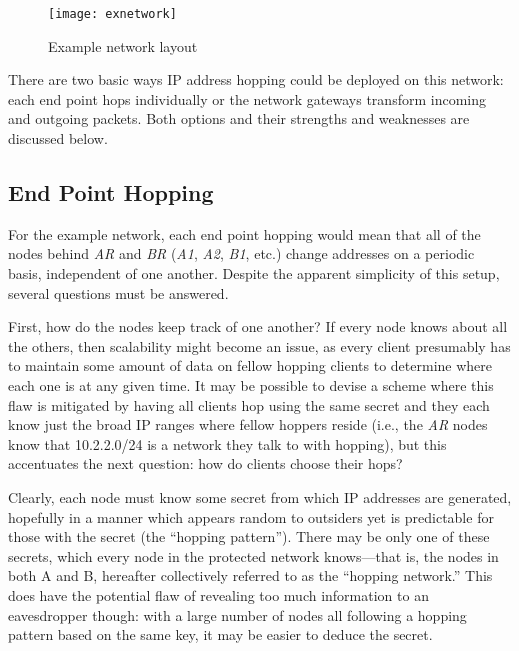 \begin{figure}
	\centering
	\texttt{[image: exnetwork]}
	\caption{Example network layout}
	\label{fig:exnetwork}
\end{figure}

\par There are two basic ways IP address hopping could be deployed on this network: each end point hops individually or the network gateways transform incoming and outgoing packets. Both options and their strengths and weaknesses are discussed below.

\subsection{End Point Hopping}
\par For the example network, each end point hopping would mean that all of the nodes behind \textit{AR} and \textit{BR} (\textit{A1}, \textit{A2}, \textit{B1}, etc.) change addresses on a periodic basis, independent of one another. Despite the apparent simplicity of this setup, several questions must be answered.

\par First, how do the nodes keep track of one another? If every node knows about all the others, then scalability might become an issue, as every client presumably has to maintain some amount of data on fellow hopping clients to determine where each one is at any given time. It may be possible to devise a scheme where this flaw is mitigated by having all clients hop using the same secret and they each know just the broad IP ranges where fellow hoppers reside (i.e., the \textit{AR} nodes know that 10.2.2.0/24 is a network they talk to with hopping), but this accentuates the next question: how do clients choose their hops?

\par Clearly, each node must know some secret from which IP addresses are generated, hopefully in a manner which appears random to outsiders yet is predictable for those with the secret (the ``hopping pattern''). There may be only one of these secrets, which every node in the protected network knows---that is, the nodes in both A and B, hereafter collectively referred to as the ``hopping network.'' This does have the potential flaw of revealing too much information to an eavesdropper though: with a large number of nodes all following a hopping pattern based on the same key, it may be easier to deduce the secret.

